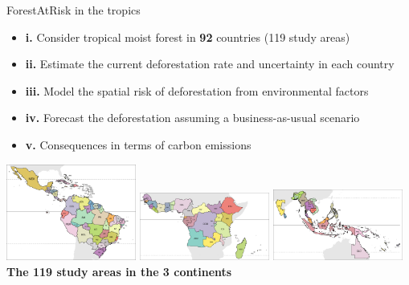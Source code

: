 \documentclass[10pt,table,dvipsnames,compress]{beamer}
\begin{document}
\begin{frame}[label={sec:orgd707d4f}]{ForestAtRisk in the tropics}
\begin{itemize}
\item \textbf{i.} Consider tropical moist forest in \textbf{92} countries (119 study areas)
\item \textbf{ii.} Estimate the current deforestation rate and uncertainty in each country
\item \textbf{iii.} Model the spatial risk of deforestation from environmental factors
\item \textbf{iv.} Forecast the deforestation assuming a business-as-usual scenario
\item \textbf{v.} Consequences in terms of carbon emissions
\end{itemize}

\vspace{0.5cm}
\begin{center}
\includegraphics[width=0.32\textwidth]{figs/sm/study_areas_America}
\includegraphics[width=0.32\textwidth]{figs/sm/study_areas_Africa}
\includegraphics[width=0.32\textwidth]{figs/sm/study_areas_Asia}
\textbf{The 119 study areas in the 3 continents}
\end{center}
\end{frame}
\end{document}

